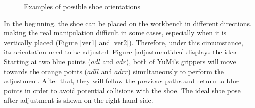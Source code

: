 \begin{figure}[H]
\centering
{}
\caption{Examples of possible shoe orientations}
\end{figure}

In the beginning, the shoe can be placed on the workbench in different directions, making the real manipulation difficult in some cases, especially when it is vertically placed (Figure \ref{ver1} and \ref{ver2}). Therefore, under this circumstance, its orientation need to be adjusted. Figure \ref{adjustmentidea} displays the idea. Starting at two blue points ($adl$ and $adr$), both of YuMi's grippers will move towards the orange points ($adll$ and $adrr$) simultaneously to perform the adjustment. After that, they will follow the previous paths and return to blue points in order to avoid potential collisions with the shoe. The ideal shoe pose after adjustment is shown on the right hand side.

